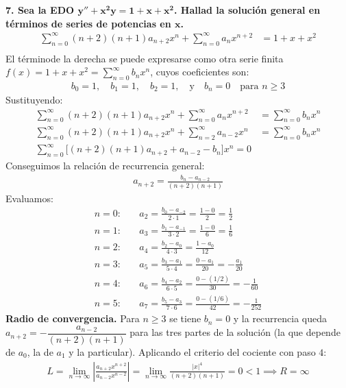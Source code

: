 \documentclass[11pt, a4paper]{article}
\begin{document}
\noindent\textbf{7. Sea la EDO $\bm{y''+x^2 y=1+x+x^2}$. Hallad la solución general en términos de series de potencias en $\bm{x}$.} \\
\begin{align*}
\sum_{n=0}^{\infty} (n+2)(n+1)a_{n+2} x^n + \sum_{n=0}^{\infty} a_n x^{n+2} &= 1 + x + x^2 \\
\end{align*}
El términode la derecha se puede expresarse como otra serie finita $f(x) = 1 + x + x^2 = \sum_{n=0}^{\infty} b_n x^n$, cuyos coeficientes son:
\begin{align*}
b_0 = 1, \quad b_1 = 1, \quad b_2 = 1, \quad \text{y} \quad b_n = 0 \quad \text{para } n \geq 3
\end{align*}
Sustituyendo:
\begin{align*}
\sum_{n=0}^{\infty} (n+2)(n+1)a_{n+2} x^n + \sum_{n=0}^{\infty} a_n x^{n+2} &= \sum_{n=0}^{\infty} b_n x^n \\
\sum_{n=0}^{\infty} (n+2)(n+1)a_{n+2} x^n + \sum_{n=2}^{\infty} a_{n-2} x^n &= \sum_{n=0}^{\infty} b_n x^n \\
\sum_{n=0}^{\infty} \big[ (n+2)(n+1)a_{n+2} + a_{n-2} - b_n \big] x^n = 0
\end{align*}
Conseguimos la relación de recurrencia general:
\begin{align*}
a_{n+2} = \frac{b_n - a_{n-2}}{(n+2)(n+1)}
\end{align*}
Evaluamos:
\begin{align*}
n=0: &\quad a_2 = \frac{b_0 - a_{-2}}{2\cdot 1} = \frac{1 - 0}{2} = \frac{1}{2} \\
n=1: &\quad a_3 = \frac{b_1 - a_{-1}}{3\cdot 2} = \frac{1 - 0}{6} = \frac{1}{6} \\
n=2: &\quad a_4 = \frac{b_2 - a_0}{4\cdot 3} = \frac{1 - a_0}{12} \\
n=3: &\quad a_5 = \frac{b_3 - a_1}{5\cdot 4} = \frac{0 - a_1}{20} = -\frac{a_1}{20} \\
n=4: &\quad a_6 = \frac{b_4 - a_2}{6\cdot 5} = \frac{0 - (1/2)}{30} = -\frac{1}{60} \\
n=5: &\quad a_7 = \frac{b_5 - a_3}{7\cdot 6} = \frac{0 - (1/6)}{42} = -\frac{1}{252}
\end{align*}
\textbf{Radio de convergencia.} Para $n\geq3$ se tiene $b_n=0$ y la recurrencia queda $a_{n+2}=-\dfrac{a_{n-2}}{(n+2)(n+1)}$ para las tres partes de la solución (la que depende de $a_0$, la de $a_1$ y la particular). Aplicando el criterio del cociente con paso $4$:
\begin{align*}
L = \lim_{n\to\infty}\left|\frac{a_{n+2}x^{n+2}}{a_{n-2}x^{n-2}}\right| = \lim_{n\to\infty}\frac{|x|^4}{(n+2)(n+1)} = 0 < 1 \implies R=\infty
\end{align*}
\end{document}
